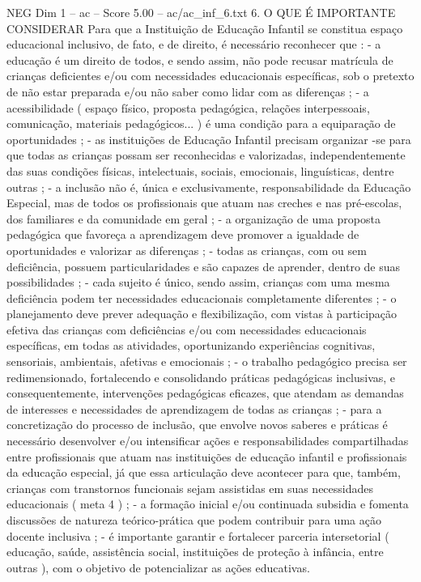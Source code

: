 \begin{textsample}{NEG Dim 1 – ac – Score 5.00 – ac/ac\_inf\_6.txt}  \label{ex:f1_neg_120}
6.
O QUE É IMPORTANTE CONSIDERAR Para que a Instituição de Educação Infantil se constitua espaço educacional inclusivo, de fato, e de direito, é necessário reconhecer que : - a educação é um direito de todos, e sendo assim, não pode recusar matrícula de crianças deficientes e/ou com necessidades educacionais específicas, sob o pretexto de não estar preparada e/ou não saber como lidar com as diferenças ; - a acessibilidade ( espaço físico, proposta pedagógica, relações interpessoais, comunicação, materiais pedagógicos... ) é uma condição para a equiparação de oportunidades ; - as instituições de Educação Infantil precisam organizar -se para que todas as crianças possam ser reconhecidas e valorizadas, independentemente das suas condições físicas, intelectuais, sociais, emocionais, linguísticas, dentre outras ; - a inclusão não é, única e exclusivamente, responsabilidade da Educação Especial, mas de todos os profissionais que atuam nas creches e nas pré-escolas, dos familiares e da comunidade em geral ; - a organização de uma proposta pedagógica que favoreça a aprendizagem deve promover a igualdade de oportunidades e valorizar as diferenças ; - todas as crianças, com ou sem deficiência, possuem particularidades e são capazes de aprender, dentro de suas possibilidades ; - cada sujeito é único, sendo assim, crianças com uma mesma deficiência podem ter necessidades educacionais completamente diferentes ; - o planejamento deve prever adequação e flexibilização, com vistas à participação efetiva das crianças com deficiências e/ou com necessidades educacionais específicas, em todas as atividades, oportunizando experiências cognitivas, sensoriais, ambientais, afetivas e emocionais ; - o trabalho pedagógico precisa ser redimensionado, fortalecendo e consolidando práticas pedagógicas inclusivas, e consequentemente, intervenções pedagógicas eficazes, que atendam as demandas de interesses e necessidades de aprendizagem de todas as crianças ; - para a concretização do processo de inclusão, que envolve novos saberes e práticas é necessário desenvolver e/ou intensificar ações e responsabilidades compartilhadas entre profissionais que atuam nas instituições de educação infantil e profissionais da educação especial, já que essa articulação deve acontecer para que, também, crianças com transtornos funcionais sejam assistidas em suas necessidades educacionais ( meta 4 ) ; - a formação inicial e/ou continuada subsidia e fomenta discussões de natureza teórico-prática que podem contribuir para uma ação docente inclusiva ; - é importante garantir e fortalecer parceria intersetorial ( educação, saúde, assistência social, instituições de proteção à infância, entre outras ), com o objetivo de potencializar as ações educativas.

\end{textsample}

